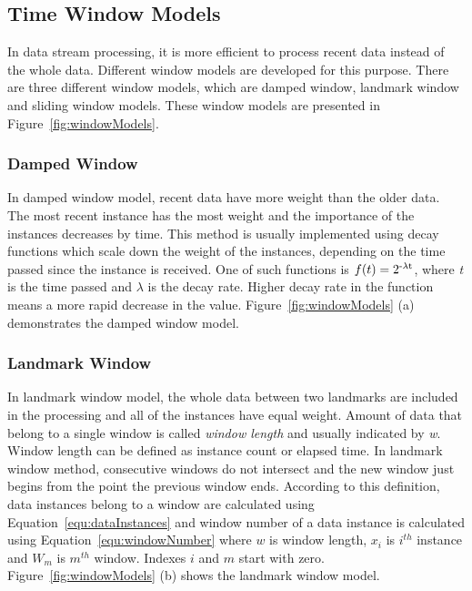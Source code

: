 \documentclass[smallcondensed]{svjour3}     %
\begin{document}
\subsection{Time Window Models}
\label{subsec:timeWindowModels}
In data stream processing, it is more efficient to process recent data instead of the whole data. Different window models are developed for this purpose. There are three different window models, which are damped window, landmark window and sliding window models. These window models are presented in Figure~\ref{fig:windowModels}.
 
\subsubsection{Damped Window}
\label{subsubsec:dampedwindow}
In damped window model, recent data have more weight than the older data. The most recent instance has the most weight and the importance of the instances decreases by time. This method is usually implemented using decay functions which scale down the weight of the instances, depending on the time passed since the instance is received. One of such functions is $f(t) = 2\textsuperscript{-$\lambda$t}$,
where \textit{t} is the time passed and $\lambda$ is the decay rate. Higher decay rate in the function means a more rapid decrease in the value. Figure~\ref{fig:windowModels} (a) demonstrates the damped window model.

\subsubsection{Landmark Window}
In landmark window model, the whole data between two landmarks are included in the processing and all of the instances have equal weight. Amount of data that belong to a single window is called \textit{window length} and usually indicated by \textit{w}. Window length can be defined as instance count or elapsed time. In landmark window method, consecutive windows do not intersect and the new window just begins from the point the previous window ends. According to this definition, data instances belong to a window are calculated using Equation~\ref{equ:dataInstances} and window number of a data instance is calculated using Equation~\ref{equ:windowNumber} where $w$ is window length, $x_i$ is $i^{th}$ instance and $W_m$ is $m^{th}$ window. Indexes $i$ and $m$ start with zero. Figure~\ref{fig:windowModels} (b) shows the landmark window model.
\end{document}
